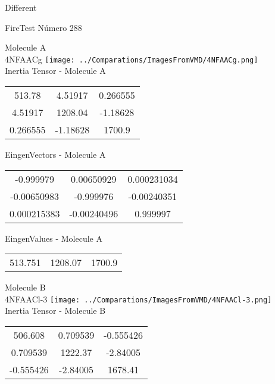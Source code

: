 \begin{center}
\vtab
\vtab
\textcolor{NavyBlue}{\Large Different}
\end{center}

 \newpage

\vtab[-2cm]
\begin{center}
{\large FireTest \tab Número 288}
\end{center}
\begin{multicols}{2}
\begin{center}

Molecule A \\ 
4NFAACg
\texttt{[image: ../Comparations/ImagesFromVMD/4NFAACg.png]}
\\
Inertia Tensor - Molecule A \\
\vtab

\begin{tabular}{|c c c|}
513.78	 & 	4.51917	 & 	0.266555	 \\
4.51917	 & 	1208.04	 & 	-1.18628	 \\
0.266555	 & 	-1.18628	 & 	1700.9
\end{tabular}

\vtab
 EingenVectors - Molecule A     \\
\vtab
\begin{tabular}{|c c c|}
-0.999979	 & 	0.00650929	 & 	0.000231034	 \\
-0.00650983	 & 	-0.999976	 & 	-0.00240351	 \\
0.000215383	 & 	-0.00240496	 & 	0.999997
\end{tabular}

\vtab
 EingenValues - Molecule A     \\
\vtab
\begin{tabular}{|c c c|}
513.751	 & 	1208.07	 & 	1700.9	 \\
\end{tabular}
\columnbreak

Molecule B \\ 
4NFAACl-3
\texttt{[image: ../Comparations/ImagesFromVMD/4NFAACl-3.png]}
\\
Inertia Tensor - Molecule B \\
\vtab

\begin{tabular}{|c c c|}
506.608	 & 	0.709539	 & 	-0.555426	 \\
0.709539	 & 	1222.37	 & 	-2.84005	 \\
-0.555426	 & 	-2.84005	 & 	1678.41
\end{tabular}


\end{center}
\end{multicols}
